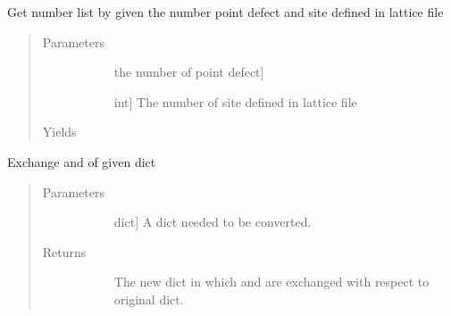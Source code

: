 \documentclass[letterpaper,10pt,english]{sphinxmanual}
\begin{document}

\begin{fulllineitems}
\label{\detokenize{pygace:pygace.utility.get_num_lis}}
Get number list by given the number point defect and site defined in
lattice file
\begin{quote}\begin{description}
\item[{Parameters}] \leavevmode\begin{description}
\item[{}] \leavevmode{[}the number of point defect{]}
\item[{}] \leavevmode{[}int{]}
The number of site defined in lattice file

\end{description}

\item[{Yields}] \leavevmode\begin{description}
\item[{}] \leavevmode
\end{description}

\end{description}\end{quote}

\end{fulllineitems}


\begin{fulllineitems}
\label{\detokenize{pygace:pygace.utility.reverse_dict}}
Exchange  and  of given dict
\begin{quote}\begin{description}
\item[{Parameters}] \leavevmode\begin{description}
\item[{}] \leavevmode{[}dict{]}
A dict needed to be converted.

\end{description}

\item[{Returns}] \leavevmode\begin{description}
\item[{}] \leavevmode
The new dict in which  and  are exchanged with respect to
original dict.

\end{description}

\end{description}\end{quote}

\end{fulllineitems}
\end{document}
